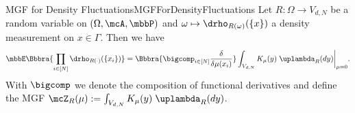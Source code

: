 \begin{mcor}{MGF for Density Fluctuations}{MGFForDensityFluctuations}
    Let $R:\Omega\to V_{d,N}$ be a random variable on $(\Omega,\mcA,\mbbP)$ and $\omega\mapsto\drho_{R(\omega)}(\{x\})$ a density measurement on $x\in\Gamma$. Then we have
    \[
        \mbbE\Bbbra{
            \prod_{i\in[N]}\drho_{R(\cdot)}(\{x_i\})
        } = \Bbbra{\bigcomp_{i\in[N]}\frac{\delta}{\delta \mu(x_i)}}\int_{V_{d,N}}K_\mu(y)\;\uplambda_R(dy)\bigg|_{\mu = 0}.
    \]
    With $\bigcomp$ we denote the composition of functional derivatives and define the MGF $\mcZ_R(\mu):=\int_{V_{d,N}}K_\mu(y)\;\uplambda_R(dy)$.
\end{mcor}